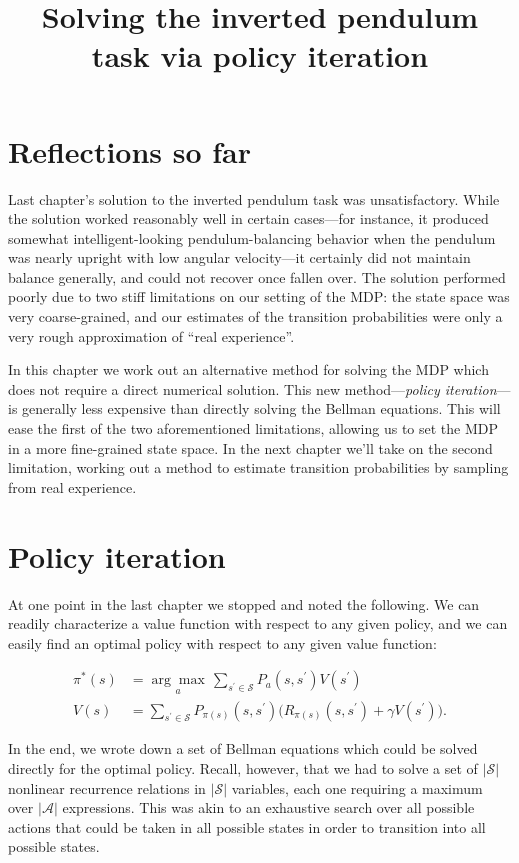 \documentclass[12pt]{article}
\title{Solving the inverted pendulum task via policy iteration}
\date{}
\begin{document}
\maketitle

\section{Reflections so far}

Last chapter's solution to the inverted pendulum task was unsatisfactory. While the solution worked reasonably well in certain cases---for instance, it produced somewhat intelligent-looking pendulum-balancing behavior when the pendulum was nearly upright with low angular velocity---it certainly did not maintain balance generally, and could not recover once fallen over. The solution performed poorly due to two stiff limitations on our setting of the MDP: the state space was very coarse-grained, and our estimates of the transition probabilities were only a very rough approximation of ``real experience''.

In this chapter we work out an alternative method for solving the MDP which does not require a direct numerical solution. This new method---\textit{policy iteration}---is generally less expensive than directly solving the Bellman equations. This will ease the first of the two aforementioned limitations, allowing us to set the MDP in a more fine-grained state space. In the next chapter we'll take on the second limitation, working out a method to estimate transition probabilities by sampling from real experience.

\section{Policy iteration}

At one point in the last chapter we stopped and noted the following. We can readily characterize a value function with respect to any given policy, and we can easily find an optimal policy with respect to any given value function:

\begin{align}
\pi^*(s) &= \underset{a}{\arg\max} \, \sum_{s^\prime \in \mathscr{S}} P_a(s, s^\prime) V(s^\prime) \\[5pt]
V(s) &= \sum_{s^\prime \in \mathscr{S}} P_{\pi(s)}(s, s^\prime) \Big(R_{\pi(s)}(s, s^\prime) + \gamma V(s^\prime)\Big).
\end{align}

In the end, we wrote down a set of Bellman equations which could be solved directly for the optimal policy. Recall, however, that we had to solve a set of $|\mathscr{S}|$ nonlinear recurrence relations in $|\mathscr{S}|$ variables, each one requiring a maximum over $|\mathscr{A}|$ expressions. This was akin to an exhaustive search over all possible actions that could be taken in all possible states in order to transition into all possible states.
\end{document}

